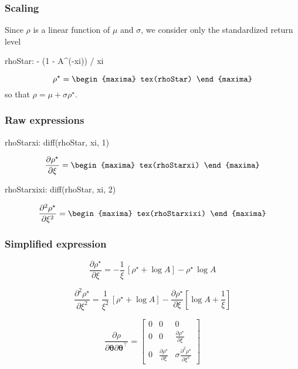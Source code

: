 \subsubsection*{Scaling}
Since $\rho$ is a linear function of $\mu$ and $\sigma$, we
consider only the standardized return level
\begin{maxima}
  rhoStar: - (1 - A^(-xi)) / xi
\end{maxima}
\[
\rho^\star=
\begin{maxima}
  tex(rhoStar)
\end{maxima}
\]
so that $\rho = \mu + \sigma \rho^\star$.

\subsubsection*{Raw expressions}
\begin{maxima}
  rhoStarxi:  diff(rhoStar, xi, 1)
\end{maxima}

{\color{MonVertF}
\[
\frac{\partial \rho^\star}{\partial \xi} = 
\begin{maxima}
  tex(rhoStarxi)
\end{maxima}
\]}


\begin{maxima}
  rhoStarxixi:  diff(rhoStar, xi, 2)
\end{maxima}

{\color{MonVertF}
\[
\frac{\partial^2 \rho^\star}{\partial \xi^2} = 
\begin{maxima}
  tex(rhoStarxixi)
\end{maxima}
\]}

\subsubsection*{Simplified expression}
{\color{red}
$$
\frac{\partial \rho^\star}{\partial \xi} =
- \frac{1}{\xi}\, \left[ \rho^\star + \log A \right] - \rho^\star \, \log A
$$
}

{\color{red}
$$
\frac{\partial^2 \rho^\star}{\partial \xi^2} = \frac{1}{\xi^2} \,
\left[ \rho^\star + \log A \right]
  - \frac{\partial \rho^\star}{\partial \xi} \left[ \log A + \frac{1}{\xi} \right]
$$
}

$$
\frac{\partial \rho}{\partial \boldsymbol{\theta}\partial \boldsymbol{\theta}^\top} =
\begin{bmatrix}
  0 & 0 & 0 \\
  0 & 0 & \frac{\partial \rho^\star}{\partial \xi}\\
  0 & \frac{\partial \rho^\star}{\partial \xi} &
  \sigma \frac{\partial^2 \rho^\star}{\partial \xi^2}
\end{bmatrix}
$$

